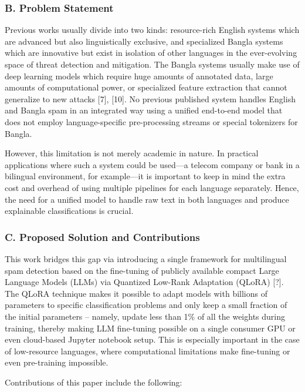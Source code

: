 \subsubsection{B. Problem Statement}\label{b.-problem-statement}

Previous works usually divide into two kinds: resource-rich English
systems which are advanced but also linguistically exclusive, and
specialized Bangla systems which are innovative but exist in isolation
of other languages in the ever-evolving space of threat detection and
mitigation. The Bangla systems usually make use of deep learning models
which require huge amounts of annotated data, large amounts of
computational power, or specialized feature extraction that cannot
generalize to new attacks {[}7{]}, {[}10{]}. No previous published
system handles English and Bangla spam in an integrated way using a
unified end-to-end model that does not employ language-specific
pre-processing streams or special tokenizers for Bangla.

However, this limitation is not merely academic in nature. In practical
applications where such a system could be used---a telecom company or
bank in a bilingual environment, for example---it is important to keep
in mind the extra cost and overhead of using multiple pipelines for each
language separately. Hence, the need for a unified model to handle raw
text in both languages and produce explainable classifications is
crucial.

\subsubsection{C. Proposed Solution and
Contributions}\label{c.-proposed-solution-and-contributions}

This work bridges this gap via introducing a single framework for
multilingual spam detection based on the fine-tuning of publicly
available compact Large Language Models (LLMs) via Quantized Low-Rank
Adaptation (QLoRA) {[}?{]}. The QLoRA technique makes it possible to
adapt models with billions of parameters to specific classification
problems and only keep a small fraction of the initial parameters --
namely, update less than 1\% of all the weights during training, thereby
making LLM fine-tuning possible on a single consumer GPU or even
cloud-based Jupyter notebook setup. This is especially important in the
case of low-resource languages, where computational limitations make
fine-tuning or even pre-training impossible.

Contributions of this paper include the following:

